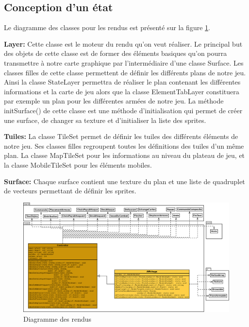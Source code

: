 \subsection{Conception d'un état}

Le diagramme des classes pour les rendus est présenté sur la figure \ref{fig:render}.

\textbf{Layer:} Cette classe est le moteur du rendu qu’on veut réaliser. Le principal but des objets de cette classe est de former des éléments basiques qu’on pourra transmettre à notre carte graphique par l’intermédiaire d’une classe Surface. Les classes filles de cette classe permettent de définir les différents plans de notre jeu. Ainsi la classe StateLayer permettra de réaliser le plan contenant les différentes informations et la carte de jeu alors que la classe ElementTabLayer constituera par exemple un plan pour les différentes armées de notre jeu.
La méthode initSurface() de cette classe est une méthode d'initialisation qui permet de créer une surface, de changer sa texture et d’initialiser la liste des sprites. 

\textbf{Tuiles:} La classe TileSet permet de définir les tuiles des différents éléments de notre jeu. Ses classes filles regroupent toutes les définitions des tuiles d’un même plan. La classe MapTileSet pour les informations au niveau du plateau de jeu, et la classe MobileTileSet pour les éléments mobiles.

\textbf{Surface:} Chaque surface contient une texture du plan et une liste de quadruplet de
vecteurs permettant de définir les sprites.




\begin{landscape}
    \begin{figure}[!htbp]
        \centering
        \includegraphics[width=21cm]{Images/render.png}
        \caption{Diagramme des rendus}
        \label{fig:render}
    \end{figure}
\end{landscape}